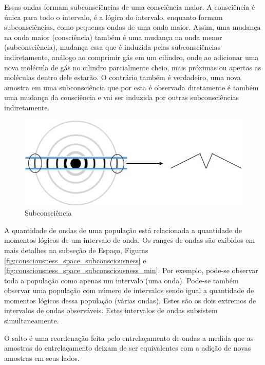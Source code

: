 Essas ondas formam subconsciências de uma consciência maior. A consciência é única para todo o intervalo, é a lógica do intervalo, enquanto formam subconsciências, como pequenas ondas de uma onda maior. Assim, uma mudança na onda maior (consciência) também é uma mudança na onda menor (subconsciência), mudança essa que é induzida pelas subconsciências indiretamente, análogo ao comprimir gás em um cilindro, onde ao adicionar uma nova molécula de gás no cilindro parcialmente cheio, mais próximas ou apertas as moléculas dentro dele estarão. O contrário também é verdadeiro, uma nova amostra em uma subconsciência que por esta é observada diretamente é também uma mudança da consciência e vai ser induzida por outras subconsciências indiretamente.
	\begin{figure}[H]
	\caption{Subconsciência}
	\label{fig:consciousness_subconscious}
	\centering
	\includegraphics[scale=1]{sections/images/consciousness_subconscious.jpg}
	\end{figure}

A quantidade de ondas de uma população está relacionada a quantidade de momentos lógicos de um intervalo de onda. Os ranges de ondas são exibidos em mais detalhes na subseção de Espaço, Figuras \ref{fig:consciousness_space_subconsciousness} e \ref{fig:consciousness_space_subconsciousness_min}. Por exemplo, pode-se observar toda a população como apenas um intervalo (uma onda). Pode-se também observar uma população com número de intervalos sendo igual a quantidade de momentos lógicos dessa população (várias ondas). Estes são os dois extremos de intervalos de ondas observáveis. Estes intervalos de ondas subsistem simultaneamente. 

O salto é uma reordenação feita pelo entrelaçamento de ondas a medida que as amostras do entrelaçamento deixam de ser equivalentes com a adição de novas amostras em seus lados.

